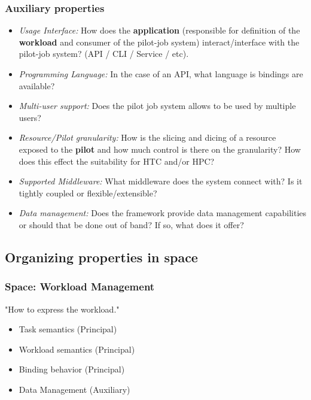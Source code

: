 \documentclass{sig-alternate}
\begin{document}
\subsubsection{Auxiliary properties}

\begin{itemize}
\item \textit{Usage Interface:} How does the \textbf{application} (responsible for
definition of the \textbf{workload} and consumer of the pilot-job system)
interact/interface with the pilot-job system? (API / CLI / Service / etc).

\item \textit{Programming Language:} In the case of an API, what language is bindings are
available?

\item \textit{Multi-user support:} Does the pilot job system allows \textbf{\pilots} to
be used by multiple users?

\item \textit{Resource/Pilot granularity:} How is the slicing and dicing of a
resource exposed to the \textbf{pilot} and how much control is there on the
granularity? How does this effect the suitability for HTC and/or HPC?

\item \textit{Supported Middleware:} What middleware does the system connect with? Is it
tightly coupled or flexible/extensible?

\item \textit{Data management:} Does the framework provide data management
capabilities or should that be done out of band? If so, what does it offer?

\end{itemize}

\subsection{Organizing properties in space}

\subsubsection{Space: Workload Management}
"How to express the workload."
\begin{itemize}
\item Task semantics (Principal)
\item Workload semantics (Principal)
\item Binding behavior (Principal)
\item Data Management (Auxiliary)
\end{itemize}
\end{document}
